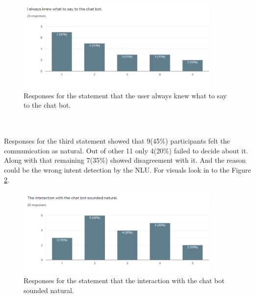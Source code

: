 \begin{figure}[!h]
    \centering
    \includegraphics[width=0.9\textwidth]{img/Say_to_Bot.PNG}
    \caption{Responses for the statement that the user always knew what to say to the chat bot.}
    \label{fig:saytoBot}
\end{figure}
\\~\\
Responses for the third statement showed that 9(45\%) participants felt the communication as natural. Out of other 11 only 4(20\%) failed to decide about it. Along with that remaining 7(35\%) showed disagreement with it. And the reason could be the wrong intent detection by the NLU. For visuals look in to the Figure \ref{fig:naturalInter}.

\begin{figure}[!h]
    \centering
    \includegraphics[width=0.9\textwidth]{img/Natural_Inter.PNG}
    \caption{Responses for the statement that the interaction with the chat bot sounded natural.}
    \label{fig:naturalInter}
\end{figure}


